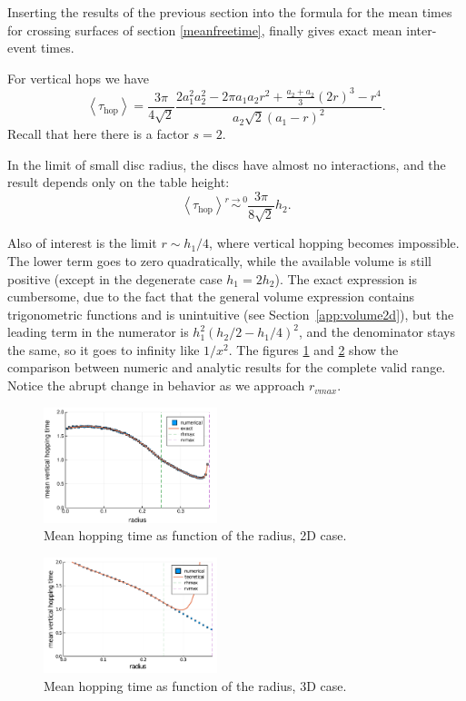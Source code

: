 \documentclass[superscriptaddress,pre,reprint,showpacs,twocolumn]{revtex4-1}
\newcommand{\mean}[1]{\left \langle #1 \right \rangle}
\begin{document}
 
Inserting the results of the previous section 
into the formula for the mean times for crossing
surfaces of section \eqref{meanfreetime}, finally gives exact mean inter-event times.

For vertical
hops we have
\begin{equation}\label{hoptau}
 \mean{\tau_\text{hop}} = 	
\frac{3 \pi}{4\sqrt{2}}
\frac{2 a_1^{2} a_2^{2}  - 2 \pi a_1 a_2 r^{2} + \textstyle \frac{a_2+a_2}{3}  (2r)^{3}  -  r^4}
{ a_2 \sqrt{2}  ( a_1 - r )^2}.
\end{equation}
Recall that here there is a factor $s = 2$.

In the limit of small disc radius, the discs have almost no interactions, and the result depends only
on the table height:
\begin{equation}\label{hoptaulimit}
 \mean{\tau_\text{hop}} \overset{r \to 0}{\sim}
\frac{3 \pi}{8\sqrt{2}}h_2.
\end{equation}

Also of interest is the limit $r\sim h_1/4$, where vertical hopping becomes
impossible.  The lower term goes to zero quadratically, while the available volume
is still positive (except in the degenerate case $h_1=2h_2$). The exact expression
is cumbersome, due to the fact that the general volume expression contains trigonometric functions
 and is unintuitive (see Section~\ref{app:volume2d}),
but the leading term in the numerator is  $h_1^2(h_2/2-h_1/4)^2$, and the denominator
stays the same, so
it goes to infinity
like $1/x^2$. The figures \ref{meanhopp2d} and
\ref{meanhopp3d} show the comparison between
numeric and analytic results for the complete valid range. Notice the abrupt
change in behavior as we approach $r_{vmax}$.

\begin{figure}[h]
  \centering
  \includegraphics[width=0.45\textwidth]{./figures/verthop2d.pdf}
  \caption{Mean hopping time as function of the radius, 2D case.}\label{meanhopp2d}
\end{figure}

\begin{figure}[h]
  \centering
  \includegraphics[width=0.45\textwidth]{./figures/verthop3d.pdf}
  \caption{Mean hopping time as function of the radius, 3D case.}\label{meanhopp3d}
\end{figure}
\end{document}
